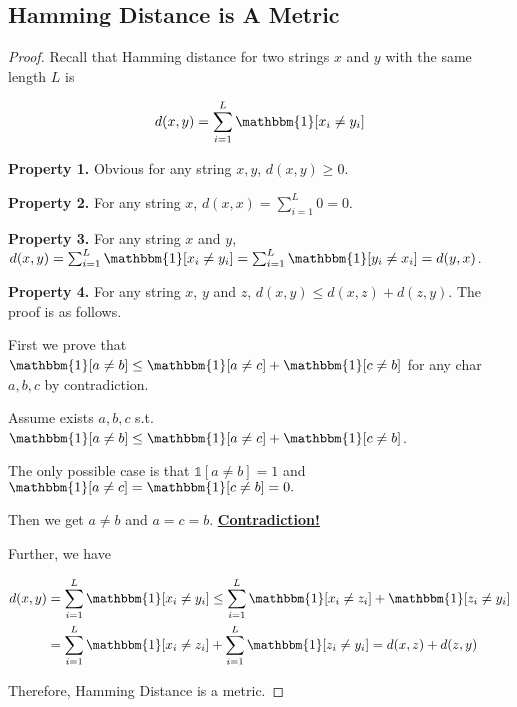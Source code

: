 \documentclass{article}
\begin{document}
\subsection{Hamming Distance is A Metric}
\vspace{1em}
\begin{proof}
    Recall that Hamming distance for two strings $x$ and $y$ with the same length $L$ is

    \vspace{-0.75em}
    $$d(x,y) = \sum_{i=1}^L \mathbbm{1}[x_i\neq y_i]$$

    \hspace{1.3em}
    \textbf{Property 1.} Obvious for any string $x,y$, $d(x,y)\geq 0$.

    \hspace{1.3em}
    \textbf{Property 2.} For any string $x$, $d(x,x)=\sum_{i=1}^L 0 = 0.$

    \hspace{1.3em}
    \textbf{Property 3.} For any string $x$ and $y$, $d(x,y)=\sum_{i=1}^L \mathbbm{1}[x_i\neq y_i] = \sum_{i=1}^L \mathbbm{1}[y_i\neq x_i] = d(y,x)$.

    \hspace{1.3em}
    \textbf{Property 4.} For any string $x$, $y$ and $z$, $d(x,y)\le d(x,z)+d(z,y).$ The proof is as follows.

    \hspace{1.3em}
    First we prove that $\mathbbm{1}[a\neq b] \le \mathbbm{1}[a\neq c] + \mathbbm{1}[c\neq b]$ for any char $a,b,c$ by contradiction.

    \hspace{1.3em}
    Assume exists $a,b,c$ s.t. $\mathbbm{1}[a\neq b] \le \mathbbm{1}[a\neq c] + \mathbbm{1}[c\neq b]$. 
    
    \hspace{1.3em}
    The only possible case is that $\mathbb{1}[a\neq b]=1$ and $\mathbbm{1}[a\neq c] = \mathbbm{1}[c\neq b] = 0.$

    \hspace{1.3em}
    Then we get $a\neq b$ and $a=c=b$. \underline{\textbf{Contradiction!}}

    \vspace{1em} \hspace{1.3em}
    Further, we have 

    \vspace{-2em}
    \begin{align*}
        d(x,y) &= \sum_{i=1}^L \mathbbm{1}[x_i\neq y_i] \le \sum_{i=1}^L \mathbbm{1}[x_i\neq z_i] + \mathbbm{1}[z_i\neq y_i] \\
        &= \sum_{i=1}^L \mathbbm{1}[x_i\neq z_i] + \sum_{i=1}^L \mathbbm{1}[z_i\neq y_i] =  d(x,z) + d(z,y)
    \end{align*}

    \hspace{1.3em}
    Therefore, Hamming Distance is a metric.
\end{proof}
\end{document}

